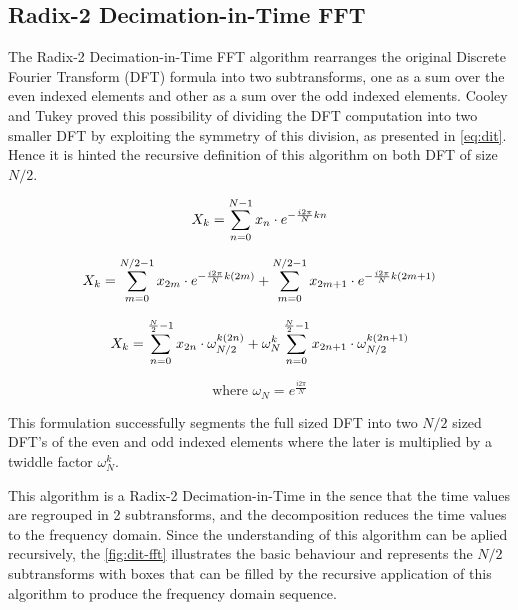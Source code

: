 \documentclass[
  oneside,
  11pt, a4paper,
  footinclude=true,
  headinclude=true,
  cleardoublepage=empty
]{scrbook}
\begin{document}

\subsection{Radix-2 Decimation-in-Time FFT} \label{subsec:radix-2-decimation-in-time-fft}


The Radix-2 Decimation-in-Time FFT algorithm rearranges the original Discrete Fourier Transform (DFT) formula into two subtransforms, one as a sum over the even indexed elements and other as a sum over the odd indexed elements. Cooley and Tukey proved this possibility of dividing the DFT computation into two smaller DFT by exploiting the symmetry of this division, as presented in \autoref{eq:dit}. Hence it is hinted the recursive definition of this algorithm on both DFT of size \(N/2\).

\begin{equation*}
    X_{k} = \sum_{n=0}^{N-1}x_{n} \cdot e^{- \frac{i 2 \pi}{N}kn} \\
\end{equation*}

\begin{equation*}
    X_{k} = \sum_{m=0}^{N/2-1}x_{2m} \cdot e^{- \frac{i 2 \pi}{N}k(2m)} + \sum_{m=0}^{N/2-1}x_{2m+1} \cdot e^{- \frac{i 2 \pi}{N}k(2m+1)} \\
\end{equation*}

\begin{equation} \label{eq:dit}
    X_{k} = \sum_{n=0}^{\frac{N}{2}-1}x_{2n} \cdot \omega_{N/2}^{k(2n)} + \omega_{N}^{k} \sum_{n=0}^{\frac{N}{2}-1}x_{2n+1} \cdot \omega_{N/2}^{k(2n+1)} \\
\end{equation}

\begin{equation*}
    \text{where } \omega_{N} = e^{\frac{i 2 \pi}{N}}
\end{equation*}

This formulation successfully segments the full sized DFT into two \(N/2\) sized DFT's of the even and odd indexed elements where the later is multiplied by a twiddle factor \( \omega_{N}^{k} \). 

This algorithm is a Radix-2 Decimation-in-Time in the sence that the time values are regrouped in 2 subtransforms, and the decomposition reduces the time values to the frequency domain. Since the understanding of this algorithm can be aplied recursively, the \autoref{fig:dit-fft} illustrates the basic behaviour and represents the \(N/2\) subtransforms with boxes that can be filled by the recursive application of this algorithm to produce the frequency domain sequence.
\end{document}
